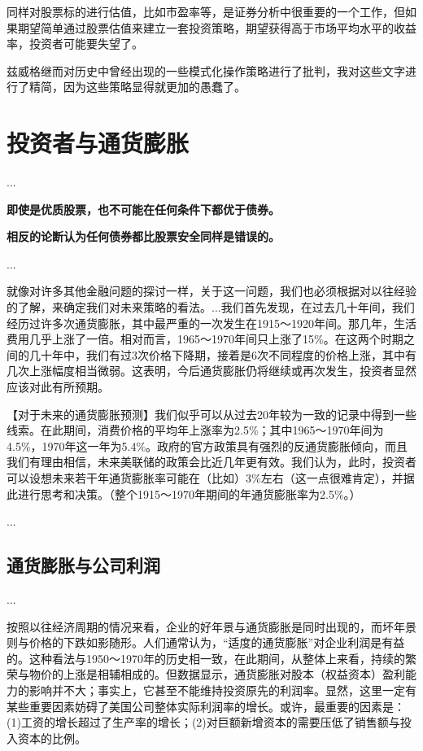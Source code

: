 \documentclass[12pt,oneside]{book}
\begin{document}
同样对股票标的进行估值，比如市盈率等，是证券分析中很重要的一个工作，但如果期望简单通过股票估值来建立一套投资策略，期望获得高于市场平均水平的收益率，投资者可能要失望了。

兹威格继而对历史中曾经出现的一些模式化操作策略进行了批判，我对这些文字进行了精简，因为这些策略显得就更加的愚蠢了。


\section{投资者与通货膨胀}
...

\textbf{即使是优质股票，也不可能在任何条件下都优于债券。}

\textbf{相反的论断认为任何债券都比股票安全同样是错误的。}

...

就像对许多其他金融问题的探讨一样，关于这一问题，我们也必须根据对以往经验的了解，来确定我们对未来策略的看法。...我们首先发现，在过去几十年间，我们经历过许多次通货膨胀，其中最严重的一次发生在1915～1920年间。那几年，生活费用几乎上涨了一倍。相对而言，1965～1970年间只上涨了15\%。在这两个时期之间的几十年中，我们有过3次价格下降期，接着是6次不同程度的价格上涨，其中有几次上涨幅度相当微弱。这表明，今后通货膨胀仍将继续或再次发生，投资者显然应该对此有所预期。

【对于未来的通货膨胀预测】我们似乎可以从过去20年较为一致的记录中得到一些线索。在此期间，消费价格的平均年上涨率为2.5\%；其中1965～1970年间为4.5\%，1970年这一年为5.4\%。政府的官方政策具有强烈的反通货膨胀倾向，而且我们有理由相信，未来美联储的政策会比近几年更有效。我们认为，此时，投资者可以设想未来若干年通货膨胀率可能在（比如）3\%左右（这一点很难肯定），并据此进行思考和决策。（整个1915～1970年期间的年通货膨胀率为2.5\%。）

...

\subsection{通货膨胀与公司利润}
...

按照以往经济周期的情况来看，企业的好年景与通货膨胀是同时出现的，而坏年景则与价格的下跌如影随形。人们通常认为，“适度的通货膨胀”对企业利润是有益的。这种看法与1950～1970年的历史相一致，在此期间，从整体上来看，持续的繁荣与物价的上涨是相辅相成的。但数据显示，通货膨胀对股本（权益资本）盈利能力的影响并不大；事实上，它甚至不能维持投资原先的利润率。显然，这里一定有某些重要因素妨碍了美国公司整体实际利润率的增长。或许，最重要的因素是：(1)工资的增长超过了生产率的增长；(2)对巨额新增资本的需要压低了销售额与投入资本的比例。
\end{document}
